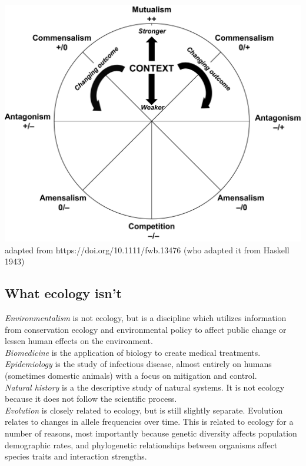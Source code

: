 \documentclass[12pt]{article}
\begin{document}
\includegraphics[width=\textwidth]{figs/wheel.jpg}
adapted from https://doi.org/10.1111/fwb.13476 (who adapted it from Haskell 1943)









\subsection*{What ecology isn't}

\textit{Environmentalism} is not ecology, but is a discipline which utilizes information from conservation ecology and environmental policy to affect public change or lessen human effects on the environment. \\


\textit{Biomedicine} is the application of biology to create medical treatments. \\


\textit{Epidemiology} is the study of infectious disease, almost entirely on humans (sometimes domestic animals) with a focus on mitigation and control. \\


\textit{Natural history} is a the descriptive study of natural systems. It is not ecology because it does not follow the scientific process. \\


\textit{Evolution} is closely related to ecology, but is still slightly separate. Evolution relates to changes in allele frequencies over time. This is related to ecology for a number of reasons, most importantly because genetic diversity affects population demographic rates, and phylogenetic relationships between organisms affect species traits and interaction strengths. 
\end{document}
